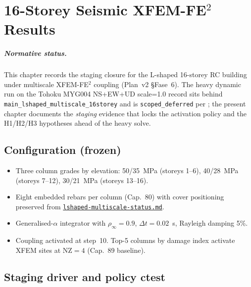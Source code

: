 
\chapter{16-Storey Seismic XFEM-FE\(^2\) Results}
\label{ch:16storey-seismic-xfem-fe2-results}

\paragraph{Normative status.}
This chapter records the staging closure for the L-shaped 16-storey
RC building under multiscale XFEM-FE\(^2\) coupling
(Plan~v2 \S Fase~6). The heavy dynamic run on the Tohoku MYG004
NS+EW+UD scale=1.0 record sits behind
\texttt{main\_lshaped\_multiscale\_16storey} and is
\texttt{scoped\_deferred} per
; the
present chapter documents the \emph{staging} evidence that locks the
activation policy and the H1/H2/H3 hypotheses ahead of the heavy
solve.

\section{Configuration (frozen)}

\begin{itemize}
  \item Three column grades by elevation:
        50/35~MPa (storeys 1--6),
        40/28~MPa (storeys 7--12),
        30/21~MPa (storeys 13--16).
  \item Eight embedded rebars per column (Cap.~80) with cover
        positioning preserved from
        \href{run:/memories/repo/lshaped-multiscale-status.md}{%
        \texttt{lshaped-multiscale-status.md}}.
  \item Generalised-\(\alpha\) integrator with \(\rho_{\infty}=0.9\),
        \(\Delta t=0.02\)~s, Rayleigh damping 5\%.
  \item Coupling activated at step~10. Top-5 columns by damage index
        activate XFEM sites at \(\mathrm{NZ}=4\) (Cap.~89 baseline).
\end{itemize}

\section{Staging driver and policy ctest}

